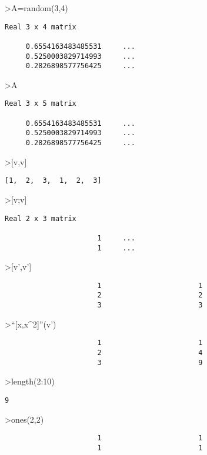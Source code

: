 \documentclass[
]{book}
\begin{document}
\textgreater A=random(3,4)

\begin{verbatim}
Real 3 x 4 matrix

     0.6554163483485531     ...
     0.5250003829714993     ...
     0.2826898577756425     ...
\end{verbatim}

\textgreater A

\begin{verbatim}
Real 3 x 5 matrix

     0.6554163483485531     ...
     0.5250003829714993     ...
     0.2826898577756425     ...
\end{verbatim}

\textgreater{[}v,v{]}

\begin{verbatim}
[1,  2,  3,  1,  2,  3]
\end{verbatim}

\textgreater{[}v;v{]}

\begin{verbatim}
Real 2 x 3 matrix

                      1     ...
                      1     ...
\end{verbatim}

\textgreater{[}v',v'{]}

\begin{verbatim}
                      1                       1 
                      2                       2 
                      3                       3 
\end{verbatim}

\textgreater{}``{[}x,x\^{}2{]}''(v')

\begin{verbatim}
                      1                       1 
                      2                       4 
                      3                       9 
\end{verbatim}

\textgreater length(2:10)

\begin{verbatim}
9
\end{verbatim}

\textgreater ones(2,2)

\begin{verbatim}
                      1                       1 
                      1                       1 
\end{verbatim}
\end{document}
